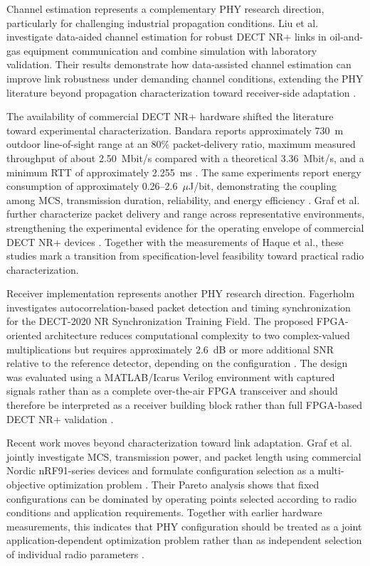 Channel estimation represents a complementary PHY research direction, particularly for challenging industrial propagation conditions. Liu et al. investigate data-aided channel estimation for robust DECT NR+ links in oil-and-gas equipment communication and combine simulation with laboratory validation. Their results demonstrate how data-assisted channel estimation can improve link robustness under demanding channel conditions, extending the PHY literature beyond propagation characterization toward receiver-side adaptation \cite{liuDataAidedChannelEstimation2025}.

The availability of commercial DECT NR+ hardware shifted the literature toward experimental characterization. Bandara reports approximately 730~m outdoor line-of-sight range at an 80\% packet-delivery ratio, maximum measured throughput of about 2.50~Mbit/s compared with a theoretical 3.36~Mbit/s, and a minimum RTT of approximately 2.255~ms \cite{bandaraExperimentalValidationAnalysis2025}. The same experiments report energy consumption of approximately 0.26--2.6~$\mu$J/bit, demonstrating the coupling among MCS, transmission duration, reliability, and energy efficiency \cite{bandaraExperimentalValidationAnalysis2025}. Graf et al. further characterize packet delivery and range across representative environments, strengthening the experimental evidence for the operating envelope of commercial DECT NR+ devices \cite{grafWhatExpectWhen2026}. Together with the measurements of Haque et al., these studies mark a transition from specification-level feasibility toward practical radio characterization.

Receiver implementation represents another PHY research direction. Fagerholm investigates autocorrelation-based packet detection and timing synchronization for the DECT-2020 NR Synchronization Training Field. The proposed FPGA-oriented architecture reduces computational complexity to two complex-valued multiplications but requires approximately 2.6~dB or more additional SNR relative to the reference detector, depending on the configuration \cite{fagerholmFPGAbasedDECT2020New2024}. The design was evaluated using a MATLAB/Icarus Verilog environment with captured signals rather than as a complete over-the-air FPGA transceiver and should therefore be interpreted as a receiver building block rather than full FPGA-based DECT NR+ validation \cite{fagerholmFPGAbasedDECT2020New2024}.

Recent work moves beyond characterization toward link adaptation. Graf et al. jointly investigate MCS, transmission power, and packet length using commercial Nordic nRF91-series devices and formulate configuration selection as a multi-objective optimization problem \cite{grafParetoOptimalityApproach2026a}. Their Pareto analysis shows that fixed configurations can be dominated by operating points selected according to radio conditions and application requirements. Together with earlier hardware measurements, this indicates that PHY configuration should be treated as a joint application-dependent optimization problem rather than as independent selection of individual radio parameters \cite{bandaraExperimentalValidationAnalysis2025, grafWhatExpectWhen2026, grafParetoOptimalityApproach2026a}.


